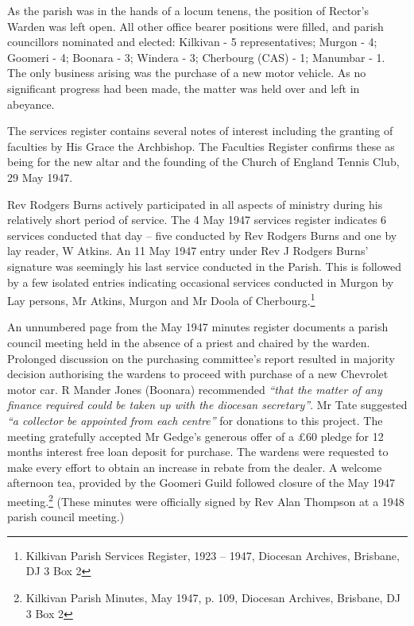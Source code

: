 As the parish was in the hands of a locum tenens, the position of Rector's Warden was left open. All other office bearer positions were filled, and parish councillors nominated and elected: Kilkivan - 5 representatives; Murgon - 4; Goomeri - 4; Boonara - 3; Windera - 3; Cherbourg (CAS) - 1; Manumbar - 1. The only business arising was the purchase of a new motor vehicle. As no significant progress had been made, the matter was held over and left in abeyance.



The services register contains several notes of interest including the granting of faculties by His Grace the Archbishop. The Faculties Register confirms these as being for the new altar and the founding of the Church of England Tennis Club, 29 May 1947.



Rev Rodgers Burns actively participated in all aspects of ministry during his relatively short period of service. The 4 May 1947 services register indicates 6 services conducted that day -- five conducted by Rev Rodgers Burns and one by lay reader, W Atkins. An 11 May 1947 entry under Rev J Rodgers Burns' signature was seemingly his last service conducted in the Parish. This is followed by a few isolated entries indicating occasional services conducted in Murgon by Lay persons, Mr Atkins, Murgon and Mr Doola of Cherbourg.\footnote{Kilkivan Parish Services Register, 1923 -- 1947, Diocesan Archives, Brisbane, DJ 3 Box 2}


An unnumbered page from the May 1947 minutes register documents a parish council meeting held in the absence of a priest and chaired by the warden. Prolonged discussion on the purchasing committee's report resulted in majority decision authorising the wardens to proceed with purchase of a new Chevrolet motor car. R Mander Jones (Boonara) recommended \emph{``that the matter of any finance required could be taken up with the diocesan secretary''}. Mr Tate suggested \emph{``a collector be appointed from each centre''} for donations to this project. The meeting gratefully accepted Mr Gedge's generous offer of a \pounds60 pledge for 12 months interest free loan deposit for purchase. The wardens were requested to make every effort to obtain an increase in rebate from the dealer. A welcome afternoon tea, provided by the Goomeri Guild followed closure of the May 1947 meeting.\footnote{Kilkivan Parish Minutes, May 1947, p. 109, Diocesan Archives, Brisbane, DJ 3 Box 2} (These minutes were officially signed by Rev Alan Thompson at a 1948 parish council meeting.)


